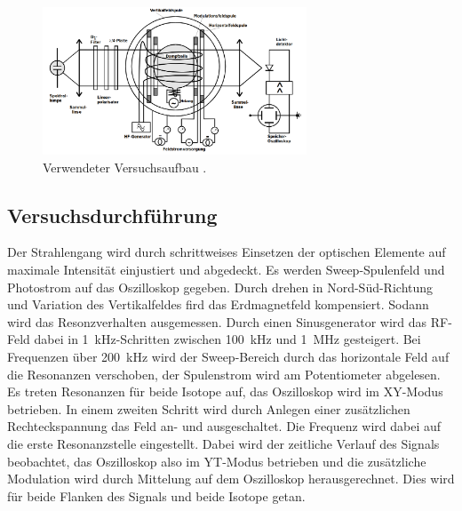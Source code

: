 \begin{figure}[H]
  \centering
  \includegraphics[width=0.7\textwidth]{content/pics/Aufbau.png}
  \caption{Verwendeter Versuchsaufbau \cite{anleitung}.}
  \label{Dur:Abb1}
\end{figure}

\subsection{Versuchsdurchführung}
Der Strahlengang wird durch schrittweises Einsetzen der optischen Elemente auf
maximale Intensität einjustiert und abgedeckt.
Es werden Sweep-Spulenfeld und Photostrom auf das Oszilloskop gegeben.
Durch drehen in Nord-Süd-Richtung und Variation des Vertikalfeldes fird das Erdmagnetfeld
kompensiert.
Sodann wird das Resonzverhalten ausgemessen.
Durch einen Sinusgenerator wird das RF-Feld dabei in \SI{1}{\kilo\hertz}-Schritten
zwischen \SI{100}{\kilo\hertz} und \SI{1}{\mega\hertz} gesteigert.
Bei Frequenzen über \SI{200}{\kilo\hertz} wird der Sweep-Bereich durch das horizontale
Feld auf die Resonanzen verschoben, der Spulenstrom wird am Potentiometer abgelesen.
Es treten Resonanzen für beide Isotope auf, das Oszilloskop wird im XY-Modus
betrieben.
In einem zweiten Schritt wird durch Anlegen einer zusätzlichen Rechteckspannung
das Feld an- und ausgeschaltet.
Die Frequenz wird dabei auf die erste Resonanzstelle eingestellt.
Dabei wird der zeitliche Verlauf des Signals beobachtet, das Oszilloskop also
im YT-Modus betrieben und die zusätzliche Modulation wird durch Mittelung
auf dem Oszilloskop herausgerechnet.
Dies wird für beide Flanken des Signals und beide Isotope getan.
